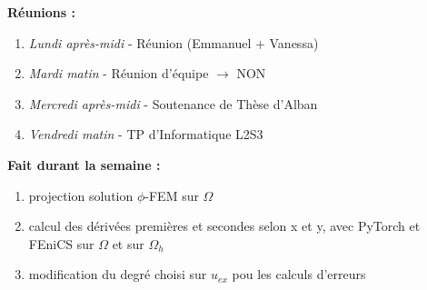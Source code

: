 \textbf{Réunions :}
\begin{enumerate}[label=\textbullet]
	\item \textit{Lundi après-midi} - Réunion (Emmanuel + Vanessa)
	\item \textit{Mardi matin} - Réunion d'équipe $\rightarrow$ NON
	\item \textit{Mercredi après-midi} - Soutenance de Thèse d'Alban
	\item \textit{Vendredi matin} - TP d'Informatique L2S3
\end{enumerate}
\textbf{Fait durant la semaine :}
\begin{enumerate}[label=\textbullet]
	\item projection solution $\phi$-FEM sur $\Omega$
	\item calcul des dérivées premières et secondes selon x et y, avec PyTorch et FEniCS sur $\Omega$ et sur $\Omega_h$
	\item modification du degré choisi sur $u_{ex}$ pou les calculs d'erreurs
\end{enumerate}